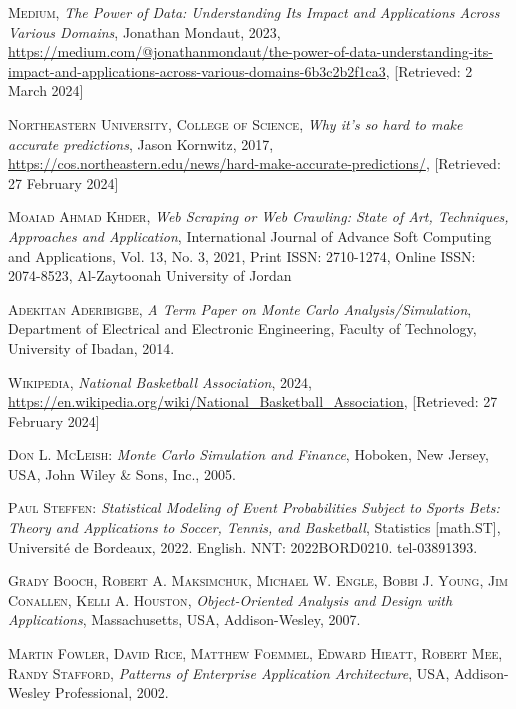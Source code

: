 \documentclass{thesis-ekf}
\theoremstyle{definition}
\theoremstyle{remark}
\begin{document}
{\begin{thebibliography}{2}

\textsc{Medium}, 
\emph {The Power of Data: Understanding Its Impact and Applications Across Various Domains}, Jonathan Mondaut, 2023, \url{https://medium.com/@jonathanmondaut/the-power-of-data-understanding-its-impact-and-applications-across-various-domains-6b3c2b2f1ca3}, [Retrieved: 2 March 2024]

\textsc{Northeastern University, College of Science},
\emph{Why it’s so hard to make accurate predictions}, Jason Kornwitz, 2017, \url{https://cos.northeastern.edu/news/hard-make-accurate-predictions/}, [Retrieved: 27 February 2024]

\textsc{Moaiad Ahmad Khder},
\emph{Web Scraping or Web Crawling: State of Art, Techniques, Approaches and Application}, 
International Journal of Advance Soft Computing and Applications, 
Vol. 13, No. 3, 2021, 
Print ISSN: 2710-1274, Online ISSN: 2074-8523, 
Al-Zaytoonah University of Jordan

\textsc{Adekitan Aderibigbe},
\emph{A Term Paper on Monte Carlo Analysis/Simulation},
Department of Electrical and Electronic Engineering,
Faculty of Technology, University of Ibadan,
2014.

\textsc{Wikipedia},
\emph{National Basketball Association}, 2024, 
\url{https://en.wikipedia.org/wiki/National_Basketball_Association}, [Retrieved: 27 February 2024]

\textsc{Don L. McLeish}: 
\emph{Monte Carlo Simulation and Finance}, 
Hoboken, New Jersey, USA, John Wiley \& Sons, Inc., 2005.

\textsc{Paul Steffen}:
\emph{Statistical Modeling of Event Probabilities Subject to Sports Bets: Theory and Applications to Soccer, Tennis, and Basketball},
Statistics [math.ST], Université de Bordeaux, 2022.
English.
NNT: 2022BORD0210.
tel-03891393.

\textsc{Grady Booch, Robert A. Maksimchuk, Michael W. Engle, Bobbi J. Young, Jim Conallen, Kelli A. Houston},
\emph{Object-Oriented Analysis and Design with Applications}, 
Massachusetts, USA, Addison-Wesley, 2007.

\textsc{Martin Fowler, David Rice, Matthew Foemmel, Edward Hieatt, Robert Mee, Randy Stafford},
\emph{Patterns of Enterprise Application Architecture},
USA, Addison-Wesley Professional, 2002.


\end{thebibliography}}
\end{document}
